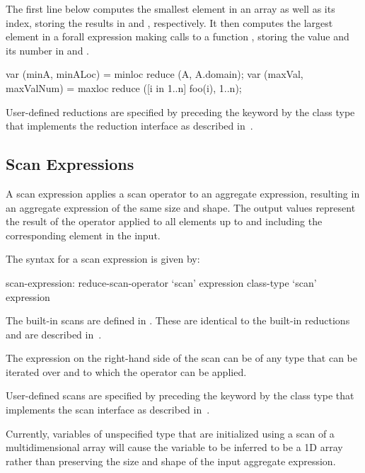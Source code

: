 \begin{example}

The first line below computes the smallest element in an array
 as well as its index, storing the results in  and
, respectively.  It then computes the largest element in
a forall expression making calls to a function , storing
the value and its number in  and .

\begin{chapel}
var (minA, minALoc) = minloc reduce (A, A.domain); 
var (maxVal, maxValNum) = maxloc reduce ([i in 1..n] foo(i), 1..n);
\end{chapel}
\end{example}

User-defined reductions are specified by preceding the
keyword  by the class type that implements the reduction
interface as described in~.

\subsection{Scan Expressions}
\label{scan}

A scan expression applies a scan operator to an aggregate expression,
resulting in an aggregate expression of the same size and shape.  The
output values represent the result of the operator applied to all
elements up to and including the corresponding element in the input.


The syntax for a scan expression is given by:
\begin{syntax}
scan-expression:
  reduce-scan-operator `scan' expression
  class-type `scan' expression
\end{syntax}

The built-in scans are defined in .  These
are identical to the built-in reductions and are described
in~.

The expression on the right-hand side of the scan can be of any type
that can be iterated over and to which the operator can be applied.

User-defined scans are specified by preceding the keyword 
by the class type that implements the scan interface as described
in~.

\begin{status}
Currently, variables of unspecified type that are initialized using a
scan of a multidimensional array will cause the variable to be
inferred to be a 1D array rather than preserving the size and shape of
the input aggregate expression.
\end{status}

